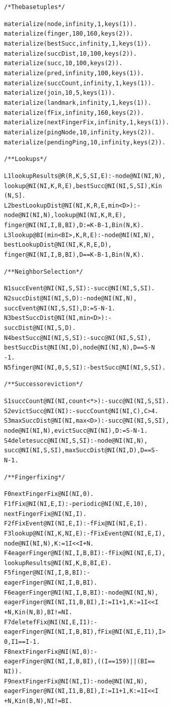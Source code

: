 \documentclass{sig-alt-full}
\newenvironment{overlog}{\begin{alltt}\small}{\end{alltt}}
\begin{document}
\begin{overlog}
/* The base tuples */

materialize(node, infinity, 1, keys(1)).
materialize(finger, 180, 160, keys(2)).
materialize(bestSucc, infinity, 1, keys(1)).
materialize(succDist, 10, 100, keys(2)).
materialize(succ, 10, 100, keys(2)).
materialize(pred, infinity, 100, keys(1)).
materialize(succCount, infinity, 1, keys(1)).
materialize(join, 10, 5, keys(1)).
materialize(landmark, infinity, 1, keys(1)).
materialize(fFix, infinity, 160, keys(2)).  
materialize(nextFingerFix, infinity, 1, keys(1)).  
materialize(pingNode, 10, infinity, keys(2)).  
materialize(pendingPing, 10, infinity, keys(2)).  


/** Lookups */

L1 lookupResults@R(R,K,S,SI,E) :- node@NI(NI,N),
  lookup@NI(NI,K,R,E), bestSucc@NI(NI,S,SI), K in
  (N,S].
L2 bestLookupDist@NI(NI,K,R,E,min<D>) :-
  node@NI(NI,N), lookup@NI(NI,K,R,E),
  finger@NI(NI,I,B,BI), D:=K - B - 1, B in (N,K).
L3 lookup@BI(min<BI>,K,R,E) :- node@NI(NI,N),
  bestLookupDist@NI(NI,K,R,E,D),
  finger@NI(NI,I,B,BI), D == K - B - 1, B in (N,K).


/** Neighbor Selection */

N1 succEvent@NI(NI,S,SI) :- succ@NI(NI,S,SI).
N2 succDist@NI(NI,S,D) :- node@NI(NI,N),
  succEvent@NI(NI,S,SI), D:=S - N - 1.
N3 bestSuccDist@NI(NI,min<D>) :-
  succDist@NI(NI,S,D).
N4 bestSucc@NI(NI,S,SI) :- succ@NI(NI,S,SI),
  bestSuccDist@NI(NI,D), node@NI(NI,N), D == S - N
  - 1.
N5 finger@NI(NI,0,S,SI) :- bestSucc@NI(NI,S,SI).


/** Successor eviction */

S1 succCount@NI(NI,count<*>) :- succ@NI(NI,S,SI).
S2 evictSucc@NI(NI) :- succCount@NI(NI,C), C > 4.
S3 maxSuccDist@NI(NI,max<D>) :- succ@NI(NI,S,SI),
  node@NI(NI,N), evictSucc@NI(NI), D:=S - N - 1.
S4 delete succ@NI(NI,S,SI) :- node@NI(NI,N),
  succ@NI(NI,S,SI), maxSuccDist@NI(NI,D), D == S -
  N - 1.

/** Finger fixing */

F0 nextFingerFix@NI(NI, 0).
F1 fFix@NI(NI,E,I) :- periodic@NI(NI,E,10),
  nextFingerFix@NI(NI,I).
F2 fFixEvent@NI(NI,E,I) :- fFix@NI(NI,E,I).
F3 lookup@NI(NI,K,NI,E) :- fFixEvent@NI(NI,E,I),
  node@NI(NI,N), K:=1I << I + N.
F4 eagerFinger@NI(NI,I,B,BI) :- fFix@NI(NI,E,I),
  lookupResults@NI(NI,K,B,BI,E).
F5 finger@NI(NI,I,B,BI) :-
  eagerFinger@NI(NI,I,B,BI).
F6 eagerFinger@NI(NI,I,B,BI) :- node@NI(NI,N),
  eagerFinger@NI(NI,I1,B,BI), I:=I1 + 1, K:=1I << I
  + N, K in (N,B), BI != NI.
F7 delete fFix@NI(NI,E,I1) :-
  eagerFinger@NI(NI,I,B,BI), fFix@NI(NI,E,I1), I >
  0, I1 == I - 1.
F8 nextFingerFix@NI(NI,0) :-
  eagerFinger@NI(NI,I,B,BI), ((I == 159) || (BI ==
  NI)).
F9 nextFingerFix@NI(NI,I) :- node@NI(NI,N),
  eagerFinger@NI(NI,I1,B,BI), I:=I1 + 1, K:=1I << I
  + N, K in (B,N), NI != BI.



\end{overlog}
\end{document}
